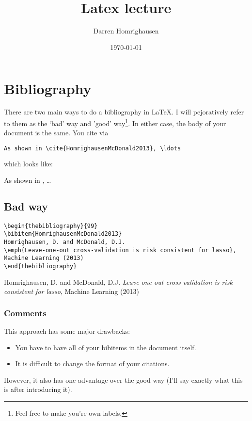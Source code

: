 \documentclass{article}
\begin{document}
\title{Latex lecture}
\author{Darren Homrighausen}
\date{\today}
\maketitle

\section{Bibliography}
There are two main ways to do a bibliography in \LaTeX{}.  I will pejoratively refer to them as the `bad' way and 'good' way\footnote{Feel free to make you're own labels.}.  In either case, the body of your document is the same.  You cite via
\begin{verbatim}
As shown in \cite{HomrighausenMcDonald2013}, \ldots
\end{verbatim}
which looks like:

As shown in \cite{HomrighausenMcDonald2013}, \ldots
\subsection{Bad way}
\begin{verbatim}
\begin{thebibliography}{99}
\bibitem{HomrighausenMcDonald2013} 
Homrighausen, D. and McDonald, D.J.
\emph{Leave-one-out cross-validation is risk consistent for lasso},
Machine Learning (2013)
\end{thebibliography}
\end{verbatim}

\begin{thebibliography}{99}
Homrighausen, D. and McDonald, D.J.
\emph{Leave-one-out cross-validation is risk consistent for lasso},
Machine Learning (2013)
\end{thebibliography}

\subsubsection{Comments}
This approach has some major drawbacks:
\begin{itemize}
\item You have to have all of your bibitems in the document itself.
\item It is difficult to change the format of your citations.
\end{itemize}
However, it also has one advantage over the good way (I'll say exactly what this is after introducing it).
\end{document}

